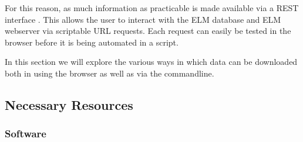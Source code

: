 \documentclass[12pt]{article}
\begin{document}
For this reason, as much information as practicable is made available via a
REST interface \citep{Fielding2002}. This allows the user to interact
with the ELM database and ELM webserver via scriptable URL requests.
Each request can easily be tested in the browser before it is being
automated in a script.

In this section we will explore the various ways in which data can be
downloaded both in using the browser as well as via the commandline.

%
%
\subsection*{Necessary Resources}
\subsubsection*{Software}

\end{document}
